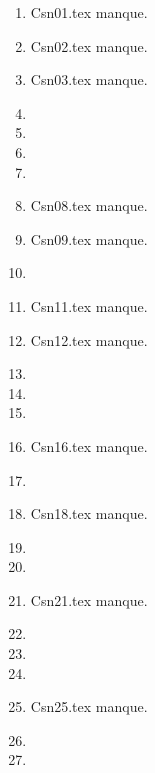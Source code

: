 \begin{enumerate}
  \item Csn01.tex manque. 
  \item Csn02.tex manque. 
  \item Csn03.tex manque. 
  \item  
  \item  
  \item  
  \item  
  \item Csn08.tex manque. 
  \item Csn09.tex manque. 
  \item  
  \item Csn11.tex manque. 
  \item Csn12.tex manque. 
  \item  
  \item  
  \item  
  \item Csn16.tex manque. 
  \item  
  \item Csn18.tex manque. 
  \item  
  \item  
  \item Csn21.tex manque. 
  \item  
  \item  
  \item  
  \item Csn25.tex manque. 
  \item  
  \item  
\end{enumerate} 
